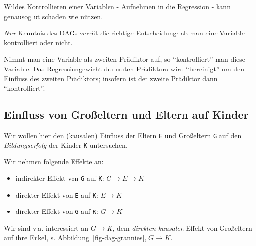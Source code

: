 \documentclass[
  a4paper,
  DIV=11]{scrreprt}
\providecommand{\tightlist}{%
  \setlength{\itemsep}{0pt}\setlength{\parskip}{0pt}}\usepackage{longtable,booktabs,array}
\theoremstyle{definition}
\theoremstyle{remark}
\begin{document}
Wildes Kontrollieren einer Variablen - Aufnehmen in die Regression -
kann genausog ut schaden wie nützen.

\emph{Nur} Kenntnis des DAGs verrät die richtige Entscheidung: ob man
eine Variable kontrolliert oder nicht.

\begin{tcolorbox}[enhanced jigsaw, left=2mm, colframe=quarto-callout-note-color-frame, opacityback=0, arc=.35mm, rightrule=.15mm, breakable, toptitle=1mm, colbacktitle=quarto-callout-note-color!10!white, colback=white, coltitle=black, bottomrule=.15mm, titlerule=0mm, opacitybacktitle=0.6, bottomtitle=1mm, title=\textcolor{quarto-callout-note-color}{\faInfo}\hspace{0.5em}{Hinweis}, toprule=.15mm, leftrule=.75mm]
Nimmt man eine Variable als zweiten Prädiktor auf, so ``kontrolliert''
man diese Variable. Das Regressiongewicht des ersten Prädiktors wird
``bereinigt'' um den Einfluss des zweiten Prädiktors; insofern ist der
zweite Prädiktor dann ``kontrolliert''.
\end{tcolorbox}

\hypertarget{einfluss-von-grouxdfeltern-und-eltern-auf-kinder}{%
\subsection{Einfluss von Großeltern und Eltern auf
Kinder}\label{einfluss-von-grouxdfeltern-und-eltern-auf-kinder}}

Wir wollen hier den (kausalen) Einfluss der Eltern \texttt{E} und
Großeltern \texttt{G} auf den \emph{Bildungserfolg} der Kinder
\texttt{K} untersuchen.

Wir nehmen folgende Effekte an:

\begin{itemize}
\tightlist
\item
  indirekter Effekt von \texttt{G} auf \texttt{K}:
  \(G \rightarrow E \rightarrow K\)
\item
  direkter Effekt von \texttt{E} auf \texttt{K}: \(E \rightarrow K\)
\item
  direkter Effekt von \texttt{G} auf \texttt{K}: \(G \rightarrow K\)
\end{itemize}

Wir sind v.a. interessiert an \(G \rightarrow K\), dem \emph{direkten
kausalen} Effekt von Großeltern auf ihre Enkel, s.
Abbildung~\ref{fig-dag-grannies}, \(G \rightarrow K\).
\end{document}
